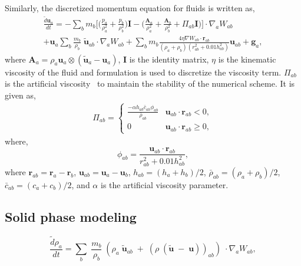 \documentclass[10pt, conference]{FMFP2022}
\newcommand{\ten}[1]{\ensuremath{\mathbf{#1}}}
\begin{document}
%
Similarly, the discretized momentum equation for fluids is written as,
\begin{multline}
  \label{eq:sph-momentum-fluid}
  \frac{\tilde{d}\ten{u}_{a}}{dt} = - \sum_{b} m_b \bigg[
  \bigg(\frac{p_a}{\rho_a^2} + \frac{p_b}{\rho_b^2}\bigg) \ten{I} -
  \bigg(\frac{\ten{A}_a}{\rho_a^2} + \frac{\ten{A}_b}{\rho_b^2} + \Pi_{ab}
  \ten{I} \bigg) \bigg]
  \cdot \nabla_{a} W_{ab} \\
  + \ten{u}_{a} \sum_{b} \frac{m_b}{\rho_{b}} \; \tilde{\ten{u}}_{ab} \cdot
  \nabla_{a} W_{ab} + \sum_{b} m_b \frac{4 \eta \nabla W_{ab}\cdot
    \ten{r}_{ab}}{(\rho_a + \rho_b) (r_{ab}^2 + 0.01 h_{ab}^2)} \ten{u}_{ab} +
  \ten{g}_{a},
\end{multline}
where $\ten{A}_a = \rho_a \ten{u}_a \otimes (\ten{\tilde{u}}_a - \ten{u}_a)$,
$\ten{I}$ is the identity matrix, $\eta$ is the kinematic viscosity of the
fluid and \cite{morris1997modeling} formulation is used to discretize the
viscosity term. $\Pi_{ab}$ is the artificial
viscosity~\cite{monaghan-review:2005} to maintain the stability of the
numerical scheme. It is given as,
\begin{align}
  \label{eq:mom-av}
  \Pi_{ab} =
  \begin{cases}
\frac{-\alpha h_{ab} \bar{c}_{ab} \phi_{ab}}{\bar{\rho}_{ab}}
  & \ten{u}_{ab}\cdot \ten{r}_{ab} < 0, \\
  0 & \ten{u}_{ab}\cdot \ten{r}_{ab} \ge 0,
\end{cases}
\end{align}
where,
%
\begin{equation}
  \label{eq:av-phiij}
  \phi_{ab} = \frac{\ten{u}_{ab} \cdot \ten{r}_{ab}}{r^2_{ab} + 0.01 h^2_{ab}},
\end{equation}
%
where $\ten{r}_{ab} = \ten{r}_a - \ten{r}_b$, $\ten{u}_{ab} = \ten{u}_a -
\ten{u}_b$, $h_{ab} = (h_a + h_b)/2$, $\bar{\rho}_{ab} = (\rho_a + \rho_b)/2$,
$\bar{c}_{ab} = (c_a + c_b) / 2$, and $\alpha$ is the artificial
viscosity parameter.



\subsection{\textbf{Solid phase modeling}}\label{subsec:solid}

\begin{equation}
  \label{eq:sph-discretization-continuity}
  \frac{\tilde{d}\rho_a}{dt} = \sum_{b} \; \frac{m_b}{\rho_{b}} \; (
  \rho_{a} \; \tilde{\ten{u}}_{ab} \; + \;
  (\rho \; (\tilde{\ten{u}} \; - \;
  \ten{u}))_{ab}) \; \cdot \nabla_{a} W_{ab},
\end{equation}
\end{document}
